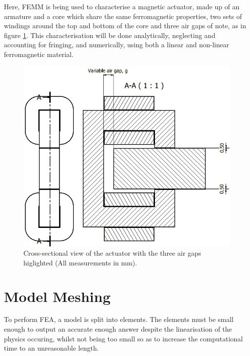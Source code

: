 \documentclass[a4paper]{IEEEtran}
\begin{document}
    Here, FEMM is being used to characterise a magnetic actuator, made up of an armature and a core which share the same ferromagnetic properties, two sets of windings around the top and bottom of the core and three air gaps of note, as in figure \ref{xsection}. This characterisation will be done analytically, neglecting and accounting for fringing, and numerically, using both a linear and non-linear ferromagnetic material. 

    \begin{figure}[ht]
        \includegraphics[width = \linewidth]{actuator-2.jpg}
        \caption{Cross-sectional view of the actuator with the three air gaps higlighted (All measurements in mm).}
        \label{xsection} 
    \end{figure}

\section{Model Meshing}

    To perform FEA, a model is split into elements. The elements must be small enough to output an accurate enough answer despite the linearisation of the physics occuring, whilst not being too small so as to increase the computational time to an unreasonable length.
\end{document}
